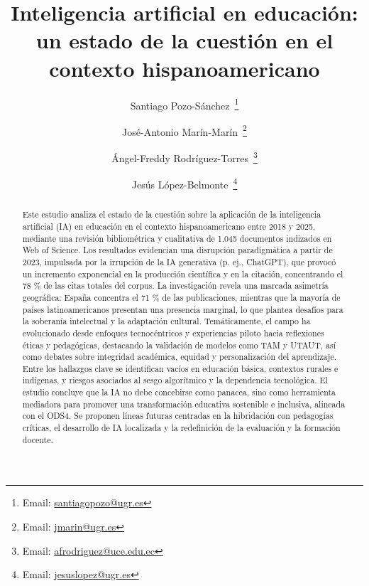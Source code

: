 \documentclass[spanish]{textolivre}
\title{Inteligencia artificial en educación: un estado de la cuestión en el contexto hispanoamericano}
\author[1]{Santiago Pozo-Sánchez~\orcid{0000-0001-8125-4990}\thanks{Email: \href{mailto:santiagopozo@ugr.es}{santiagopozo@ugr.es}}}
\author[1]{José-Antonio Marín-Marín~\orcid{0000-0001-8623-4796}\thanks{Email: \href{mailto:jmarin@ugr.es}{jmarin@ugr.es}}}
\author[2]{Ángel-Freddy Rodríguez-Torres~\orcid{0000-0001-5047-2629}\thanks{Email: \href{mailto:afrodriguez@uce.edu.ec}{afrodriguez@uce.edu.ec}}}
\author[1]{Jesús López-Belmonte~\orcid{0000-0003-0823-3370}\thanks{Email: \href{mailto:jesuslopez@ugr.es}{jesuslopez@ugr.es}}}
\affil[1]{Universidad de Granada, Granada, España.}
\affil[2]{Universidad Central del Ecuador, Quito, Ecuador.}
\begin{document}
\maketitle

\begin{polyabstract}
\begin{abstract}
Este estudio analiza el estado de la cuestión sobre la aplicación de la inteligencia artificial (IA) en educación en el contexto hispanoamericano entre 2018 y 2025, mediante una revisión bibliométrica y cualitativa de 1.045 documentos indizados en Web of Science. Los resultados evidencian una disrupción paradigmática a partir de 2023, impulsada por la irrupción de la IA generativa (p. ej., ChatGPT), que provocó un incremento exponencial en la producción científica y en la citación, concentrando el 78 \% de las citas totales del corpus. La investigación revela una marcada asimetría geográfica: España concentra el 71 \% de las publicaciones, mientras que la mayoría de países latinoamericanos presentan una presencia marginal, lo que plantea desafíos para la soberanía intelectual y la adaptación cultural. Temáticamente, el campo ha evolucionado desde enfoques tecnocéntricos y experiencias piloto hacia reflexiones éticas y pedagógicas, destacando la validación de modelos como TAM y UTAUT, así como debates sobre integridad académica, equidad y personalización del aprendizaje. Entre los hallazgos clave se identifican vacíos en educación básica, contextos rurales e indígenas, y riesgos asociados al sesgo algorítmico y la dependencia tecnológica. El estudio concluye que la IA no debe concebirse como panacea, sino como herramienta mediadora para promover una transformación educativa sostenible e inclusiva, alineada con el ODS4. Se proponen líneas futuras centradas en la hibridación con pedagogías críticas, el desarrollo de IA localizada y la redefinición de la evaluación y la formación docente.

\end{abstract}


\end{polyabstract}
\end{document}
